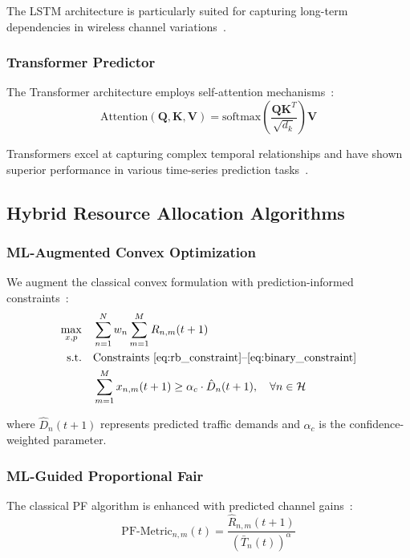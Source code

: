 \documentclass[conference]{IEEEtran}
\begin{document}
The LSTM architecture is particularly suited for capturing long-term dependencies in wireless channel variations~\cite{lstm_wireless}.

\subsubsection{Transformer Predictor}
The Transformer architecture employs self-attention mechanisms~\cite{transformer_networks,attention_wireless}:
\begin{equation}
\text{Attention}(\mathbf{Q}, \mathbf{K}, \mathbf{V}) = \text{softmax}\left(\frac{\mathbf{Q}\mathbf{K}^T}{\sqrt{d_k}}\right)\mathbf{V}
\end{equation}

Transformers excel at capturing complex temporal relationships and have shown superior performance in various time-series prediction tasks~\cite{transformer_networks}.

\subsection{Hybrid Resource Allocation Algorithms}

\subsubsection{ML-Augmented Convex Optimization}
We augment the classical convex formulation with prediction-informed constraints~\cite{warm_start_optimization}:
\begin{align}
\max_{x,p} \quad &\sum_{n=1}^{N} w_n \sum_{m=1}^{M} R_{n,m}(t+1) \\
\text{s.t.} \quad &\text{Constraints } \eqref{eq:rb_constraint}\text{--}\eqref{eq:binary_constraint}\\
&\sum_{m=1}^{M} x_{n,m}(t+1) \geq \alpha_c \cdot \hat{D}_n(t+1), \quad \forall n \in \mathcal{H}
\end{align}

where $\hat{D}_n(t+1)$ represents predicted traffic demands and $\alpha_c$ is the confidence-weighted parameter.

\subsubsection{ML-Guided Proportional Fair}
The classical PF algorithm is enhanced with predicted channel gains~\cite{pf_algorithm}:
\begin{equation}
\text{PF-Metric}_{n,m}(t) = \frac{\hat{R}_{n,m}(t+1)}{(\bar{T}_n(t))^{\alpha}}
\end{equation}
\end{document}
